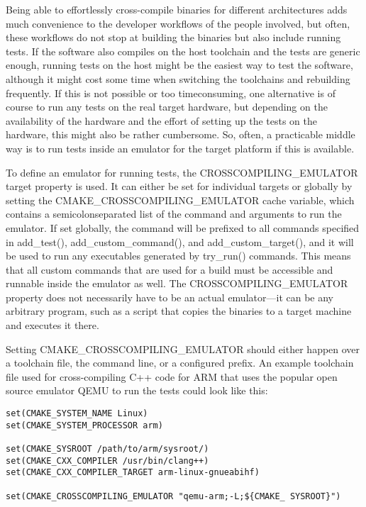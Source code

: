 
Being able to effortlessly cross-compile binaries for different architectures adds much convenience to the developer workflows of the people involved, but often, these workflows do not stop at building the binaries but also include running tests. If the software also compiles on the host toolchain and the tests are generic enough, running tests on the host might be the easiest way to test the software, although it might cost some time when switching the toolchains and rebuilding frequently. If this is not possible or too timeconsuming, one alternative is of course to run any tests on the real target hardware, but depending on the availability of the hardware and the effort of setting up the tests on the hardware, this might also be rather cumbersome. So, often, a practicable middle way is to run tests inside an emulator for the target platform if this is available.

To define an emulator for running tests, the CROSSCOMPILING\_EMULATOR target property is used. It can either be set for individual targets or globally by setting the CMAKE\_CROSSCOMPILING\_EMULATOR cache variable, which contains a semicolonseparated list of the command and arguments to run the emulator. If set globally, the command will be prefixed to all commands specified in add\_test(), add\_custom\_command(), and add\_custom\_target(), and it will be used to run any executables generated by try\_run() commands. This means that all custom commands that are used for a build must be accessible and runnable inside the emulator as well. The CROSSCOMPILING\_EMULATOR property does not necessarily have to be an actual emulator—it can be any arbitrary program, such as a script that copies the binaries to a target machine and executes it there.

Setting CMAKE\_CROSSCOMPILING\_EMULATOR should either happen over a toolchain
file, the command line, or a configured prefix. An example toolchain file used for cross-compiling C++ code for ARM that uses the popular open source emulator QEMU to run the tests could look like this:

\begin{lstlisting}[style=styleCMake]
set(CMAKE_SYSTEM_NAME Linux)
set(CMAKE_SYSTEM_PROCESSOR arm)

set(CMAKE_SYSROOT /path/to/arm/sysroot/)
set(CMAKE_CXX_COMPILER /usr/bin/clang++)
set(CMAKE_CXX_COMPILER_TARGET arm-linux-gnueabihf)

set(CMAKE_CROSSCOMPILING_EMULATOR "qemu-arm;-L;${CMAKE_	SYSROOT}")
\end{lstlisting}

